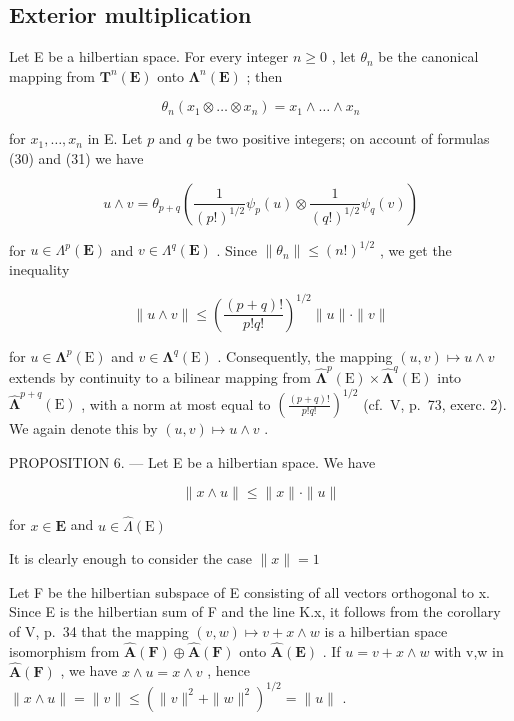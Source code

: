 \subsection{Exterior multiplication}

Let E be a hilbertian space. For every integer \(n \geqslant 0\) , let \(\theta_{n}\) be the canonical mapping from \(\mathbf{T}^{n}(\mathbf{E})\) onto \(\symbf{\Lambda}^{n}(\mathbf{E})\) ; then

\[
\theta_ {n} (x _ {1} \otimes \ldots \otimes x _ {n}) = x _ {1} \wedge \ldots \wedge x _ {n}\tag{31}
\]

for \(x_{1}, \ldots, x_{n}\) in E. Let \(p\) and \(q\) be two positive integers; on account of formulas (30) and (31) we have

\[
u \wedge v = \theta_ {p + q} \left(\frac {1}{(p !) ^ {1 / 2}} \psi_ {p} (u) \otimes \frac {1}{(q !) ^ {1 / 2}} \psi_ {q} (v)\right)\tag{32}
\]

for \(u \in \Lambda^p(\mathbf{E})\) and \(v \in \Lambda^q(\mathbf{E})\) . Since \(\| \theta_n \| \leqslant (n!)^{1/2}\) , we get the inequality

\[
\| u \wedge v \| \leqslant \left(\frac {(p + q) !}{p ! q !}\right) ^ {1 / 2} \| u \| \cdot \| v \|\tag{33}
\]

for \(u \in \symbf{\Lambda}^p(\mathrm{E})\) and \(v \in \symbf{\Lambda}^q(\mathrm{E})\) . Consequently, the mapping \((u, v) \mapsto u \wedge v\) extends by continuity to a bilinear mapping from \(\hat{\symbf{\Lambda}}^p(\mathrm{E}) \times \hat{\symbf{\Lambda}}^q(\mathrm{E})\) into \(\hat{\symbf{\Lambda}}^{p + q}(\mathrm{E})\) , with a norm at most equal to \(\left(\frac{(p + q)!}{p!q!}\right)^{1/2}\) (cf.~V, p.~73, exerc. 2). We again denote this by \((u, v) \mapsto u \wedge v\) .

PROPOSITION 6. --- Let E be a hilbertian space. We have

\[
\| x \wedge u \| \leqslant \| x \| \cdot \| u \|\tag{34}
\]

for \(x\in \mathbf{E}\) and \(u\in \hat{\Lambda} (\mathrm{E})\)

It is clearly enough to consider the case \(\| x\| = 1\)

Let F be the hilbertian subspace of E consisting of all vectors orthogonal to x. Since E is the hilbertian sum of F and the line K.x, it follows from the corollary of V, p.~34 that the mapping \((v,w)\mapsto v+x\wedge w\) is a hilbertian space isomorphism from \(\hat{\mathbf{A}}(\mathbf{F})\oplus\hat{\mathbf{A}}(\mathbf{F})\) onto \(\hat{\mathbf{A}}(\mathbf{E})\) . If \(u=v+x\wedge w\) with v,w in \(\hat{\mathbf{A}}(\mathbf{F})\) , we have \(x\wedge u=x\wedge v\) , hence \(\|x\wedge u\|=\|v\|\leqslant(\|v\|^{2}+\|w\|^{2})^{1/2}=\|u\|\) .

